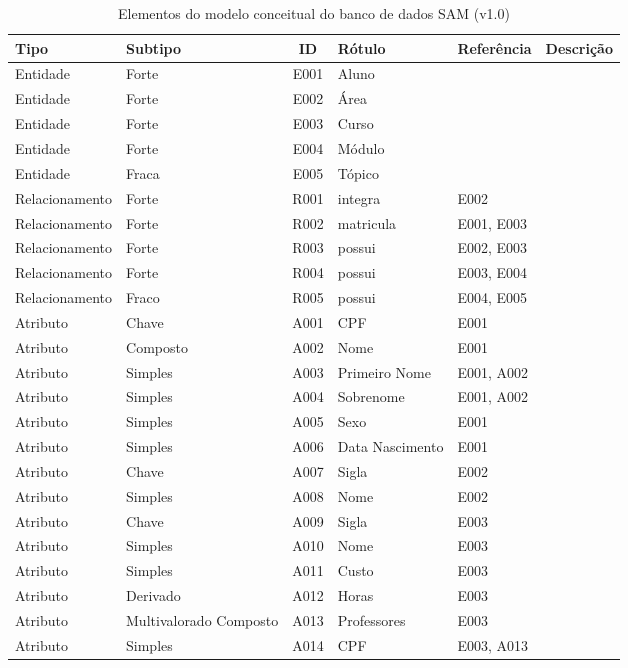 \documentclass{article}
\begin{document}
\begin{table}[!htb]
    \caption{Elementos do modelo conceitual do banco de dados SAM (v1.0)}
	\begin{tabularx}{\textwidth}{p{2.25cm} m{2.0cm} c p{2.5cm} m{1.75cm} m{4.75cm}}
		\toprule
		\textbf{Tipo} &
		\textbf{Subtipo} &
		\textbf{ID} &
		\textbf{R\'otulo} &
		\textbf{Refer\^encia} &
		\textbf{Descri\c{c}\~ao} \\ \midrule
		Entidade & Forte & E001 & Aluno & & \\
		Entidade & Forte & E002 & \'Area & & \\
		Entidade & Forte & E003 & Curso & & \\
		Entidade & Forte & E004 & M\'odulo & & \\
		Entidade & Fraca & E005 & T\'opico & & \\
		Relacionamento & Forte & R001 & integra & E002 & \\
		Relacionamento & Forte & R002 & matricula & E001, E003 & \\
		Relacionamento & Forte & R003 & possui & E002, E003 & \\
		Relacionamento & Forte & R004 & possui & E003, E004 & \\
		Relacionamento & Fraco & R005 & possui & E004, E005 & \\
		Atributo & Chave & A001 & CPF & E001 & \\
		Atributo & Composto & A002 & Nome & E001 & \\
		Atributo & Simples & A003 & Primeiro Nome & E001, A002 & \\
		Atributo & Simples & A004 & Sobrenome & E001, A002 & \\
		Atributo & Simples & A005 & Sexo & E001 & \\
		Atributo & Simples & A006 & Data Nascimento & E001 & \\
		Atributo & Chave & A007 & Sigla & E002 & \\
		Atributo & Simples & A008 & Nome & E002 & \\
		Atributo & Chave& A009 & Sigla & E003 & \\
		Atributo & Simples & A010 & Nome & E003 & \\
		Atributo & Simples & A011 & Custo & E003 & \\
		Atributo & Derivado & A012 & Horas & E003 & \\
		Atributo & Multivalorado Composto & A013 & Professores & E003 & \\
		Atributo & Simples & A014 & CPF & E003, A013 & \\

\end{tabularx}
\end{table}
\end{document}
